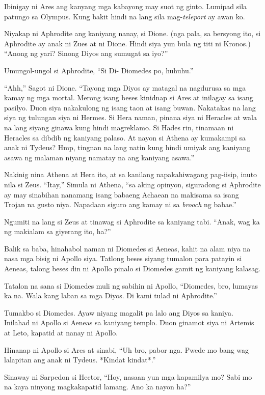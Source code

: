 \documentclass[12pt,letterpaper]{report}
\begin{document}
Ibinigay ni Ares ang kanyang mga kabayong may suot ng ginto. Lumipad sila patungo sa Olympus. Kung bakit hindi na lang sila mag-\textit{teleport} ay awan ko.

Niyakap ni Aphrodite ang kaniyang nanay, si Dione. (nga pala, sa bersyong ito, si Aphrodite ay anak ni Zues at ni Dione. Hindi siya yun bula ng titi ni Kronos.) ``Anong ng yari? Sinong Diyos ang sumugat sa iyo?''

Umungol-ungol si Aphrodite, ``Si Di- Diomedes po, huhuhu.''

``Ahh,'' Sagot ni Dione. ``Tayong mga Diyos ay matagal na nagdurusa sa mga kamay ng mga mortal. Merong isang beses kinidnap si Ares at inilagay sa isang pasilyo. Duon siya nakakulong ng isang taon at isang buwan. Nakatakas na lang siya ng tulungan siya ni Hermes. Si Hera naman, pinana siya ni Heracles at wala na lang siyang ginawa kung hindi magreklamo. Si Hades rin, tinamaan ni Heracles sa dibdib ng kaniyang palaso. At nayon si Athena ay kumakampi sa anak ni Tydeus? Hmp, tingnan na lang natin kung hindi umiyak ang kaniyang asawa ng malaman niyang namatay na ang kaniyang asawa.''

Nakinig nina Athena at Hera ito, at sa kanilang napakahiwagang pag-iisip, inuto nila si Zeus. ``Itay,'' Simula ni Athena, ``sa aking opinyon, siguradong si Aphrodite ay may sinabihan nanamang isang babaeng Achaean na makisama sa isang Trojan na gusto niya. Napadaan siguro ang kamay ni sa \textit{brooch} ng babae.''

Ngumiti na lang si Zeus at tinawag si Aphrodite sa kaniyang tabi. ``Anak, wag ka ng makialam sa giyerang ito, ha?''

Balik sa baba, hinahabol naman ni Diomedes si Aeneas, kahit na alam niya na nasa mga bisig ni Apollo siya. Tatlong beses siyang tumalon para patayin si Aeneas, talong beses din ni Apollo pinalo si Diomedes gamit ng kaniyang kalasag.

Tatalon na sana si Diomedes muli ng sabihin ni Apollo, ``Diomedes, bro, lumayas ka na. Wala kang laban sa mga Diyos. Di kami tulad ni Aphrodite.''

Tumakbo si Diomedes. Ayaw niyang magalit pa lalo ang Diyos sa kaniya. Inilahad ni Apollo si Aeneas sa kaniyang templo. Duon ginamot siya ni Artemis at Leto, kapatid at nanay ni Apollo.

Hinanap ni Apollo si Ares at sinabi, ``Uh bro, pabor nga. Pwede mo bang wag lalapitan ang anak ni Tydeus. *Kindat kindat*.''

Sinaway ni Sarpedon si Hector, ``Hoy, nasaan yun mga kapamilya mo? Sabi mo na kaya ninyong magkakapatid lamang. Ano ka nayon ha?''
\end{document}
